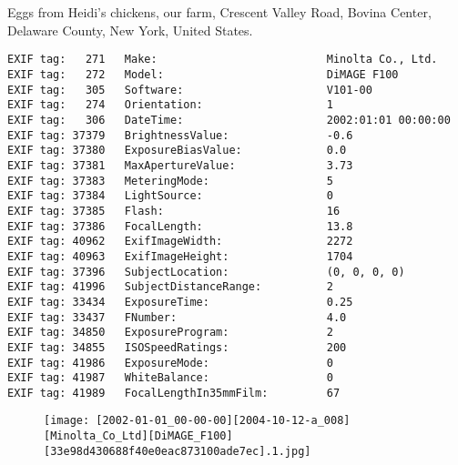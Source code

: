 \section{\protect{}}
\noindent Eggs from Heidi's chickens, our farm, Crescent Valley Road, Bovina Center, Delaware County, New York, United States.
\noindent
\begin{lstlisting}
EXIF tag:   271   Make:                          Minolta Co., Ltd.
EXIF tag:   272   Model:                         DiMAGE F100
EXIF tag:   305   Software:                      V101-00
EXIF tag:   274   Orientation:                   1
EXIF tag:   306   DateTime:                      2002:01:01 00:00:00
EXIF tag: 37379   BrightnessValue:               -0.6
EXIF tag: 37380   ExposureBiasValue:             0.0
EXIF tag: 37381   MaxApertureValue:              3.73
EXIF tag: 37383   MeteringMode:                  5
EXIF tag: 37384   LightSource:                   0
EXIF tag: 37385   Flash:                         16
EXIF tag: 37386   FocalLength:                   13.8
EXIF tag: 40962   ExifImageWidth:                2272
EXIF tag: 40963   ExifImageHeight:               1704
EXIF tag: 37396   SubjectLocation:               (0, 0, 0, 0)
EXIF tag: 41996   SubjectDistanceRange:          2
EXIF tag: 33434   ExposureTime:                  0.25
EXIF tag: 33437   FNumber:                       4.0
EXIF tag: 34850   ExposureProgram:               2
EXIF tag: 34855   ISOSpeedRatings:               200
EXIF tag: 41986   ExposureMode:                  0
EXIF tag: 41987   WhiteBalance:                  0
EXIF tag: 41989   FocalLengthIn35mmFilm:         67

\end{lstlisting}
\clearpage
\begin{figure}
\raggedleft
\texttt{[image: [2002-01-01\_00-00-00][2004-10-12-a\_008][Minolta\_Co\_Ltd][DiMAGE\_F100][33e98d430688f40e0eac873100ade7ec].1.jpg]}
\end{figure}


\clearpage
